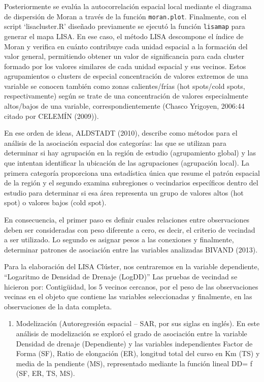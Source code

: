 \documentclass[11pt,]{article}
\providecommand{\tightlist}{%
\setlength{\itemsep}{0pt}\setlength{\parskip}{0pt}}
\begin{document}
Posteriormente se evalúa la autocorrelación espacial local mediante el
diagrama de dispersión de Moran a través de la función
\texttt{moran.plot}. Finalmente, con el script `lisacluster.R' diseñado
previamente se ejecutó la función \texttt{lisamap} para generar el mapa
LISA. En ese caso, el método LISA descompone el índice de Moran y
verifica en cuánto contribuye cada unidad espacial a la formación del
valor general, permitiendo obtener un valor de significancia para cada
cluster formado por los valores similares de cada unidad espacial y sus
vecinos. Estos agrupamientos o clusters de especial concentración de
valores extremos de una variable se conocen también como zonas
calientes/frías (hot spots/cold spots, respectivamente) según se trate
de una concentración de valores especialmente altos/bajos de una
variable, correspondientemente (Chasco Yrigoyen, 2006:44 citado por
CELEMÍN (2009)).

En ese orden de ideas, ALDSTADT (2010), describe como métodos para el
análisis de la asociación espacial dos categorías: las que se utilizan
para determinar si hay agrupación en la región de estudio (agrupamiento
global) y las que intentan identificar la ubicación de las agrupaciones
(agrupación local). La primera categoría proporciona una estadística
única que resume el patrón espacial de la región y el segundo examina
subregiones o vecindarios específicos dentro del estudio para determinar
si esa área representa un grupo de valores altos (hot spot) o valores
bajos (cold spot).

En consecuencia, el primer paso es definir cuales relaciones entre
observaciones deben ser consideradas con peso diferente a cero, es
decir, el criterio de vecindad a ser utilizado. Lo segundo es asignar
pesos a las conexiones y finalmente, determinar patrones de asociación
entre las variables analizadas BIVAND (2013).

Para la elaboración del LISA Clúster, nos centraremos en la variable
dependiente, ``Logaritmo de Densidad de Drenaje (LogDD)'' Las pruebas de
vecindad se hicieron por: Contigüidad, los 5 vecinos cercanos, por el
peso de las observaciones vecinas en el objeto que contiene las
variables seleccionadas y finalmente, en las observaciones de la data
completa.

\begin{enumerate}
\def\labelenumi{\arabic{enumi}.}
\setcounter{enumi}{1}
\tightlist
\item
  Modelización (Autoregresión espacial -- SAR, por sus siglas en
  inglés). En este análisis de modelización se exploró el grado de
  asociación entre la variable Densidad de drenaje (Dependiente) y las
  variables independientes Factor de Forma (SF), Ratio de elongación
  (ER), longitud total del curso en Km (TS) y media de la pendiente
  (MS), representado mediante la función lineal DD= f (SF, ER, TS, MS).
\end{enumerate}
\end{document}
